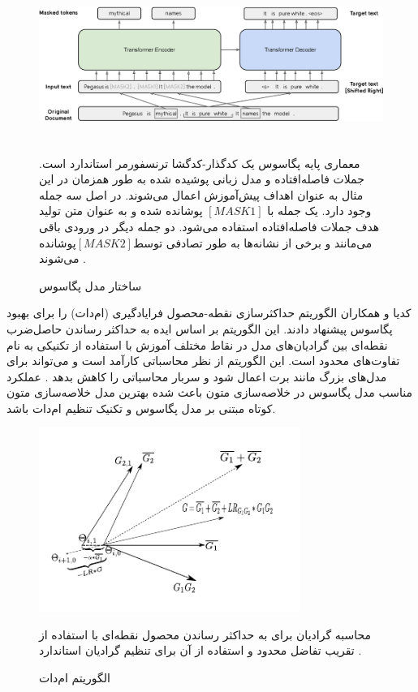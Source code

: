\begin{figure}[!h]
	\begin{center}
		\includegraphics[height=5cm]{pegasus.png}
	\end{center}
	\caption{ ساختار مدل پگاسوس \cite{zhang2020pegasus}}
	\label{fig:pegasus}
	\medskip
	\small{
		معماری پایه پگاسوس یک کدگذار-کدگشا ترنسفورمر استاندارد است. جملات فاصله‌افتاده و مدل زبانی پوشیده شده به طور همزمان در این مثال به عنوان اهداف پيش‌آموزش اعمال می‌شوند. در اصل سه جمله وجود دارد. یک جمله با $ [MASK1] $ پوشانده شده و به عنوان متن تولید هدف جملات فاصله‌افتاده استفاده می‌شود. دو جمله دیگر در ورودی باقی می‌مانند و برخی از نشانه‌ها به طور تصادفی توسط$ [MASK2] $پوشانده می‌شوند
		 \cite{zhang2020pegasus}.}
\end{figure}

کدیا
و همکاران الگوریتم حداکثرسازی نقطه-محصول فرایادگیری (ام‌دات)
را برای بهبود پگاسوس پیشنهاد دادند. این الگوریتم بر اساس ایده به حداکثر رساندن حاصل‌ضرب نقطه‌ای بین گرادیان‌های مدل در نقاط مختلف آموزش با استفاده از تکنیکی به نام تفاوت‌های محدود
است. این الگوریتم از نظر محاسباتی کارآمد است و می‌تواند برای مدل‌های بزرگ مانند برت اعمال شود و سربار محاسباتی را کاهش بدهد \cite{sherborne2023meta}.
عملکرد مناسب مدل پگاسوس در خلاصه‌سازی متون باعث شده بهترین مدل خلاصه‌سازی متون کوتاه مبتنی بر مدل پگاسوس و تکنیک تنظیم
ام‌دات باشد.

\begin{figure}[!h]
	\begin{center}
		\includegraphics[height=6cm]{Mdot.png}
	\end{center}
	\caption{ الگوریتم ام‌دات \cite{sherborne2023meta}}
	\label{fig:Mdot}
	\medskip
	\small{
		محاسبه گرادیان برای به حداکثر رساندن محصول نقطه‌ای با استفاده از تقریب تفاضل محدود و استفاده از آن برای تنظیم گرادیان استاندارد \cite{sherborne2023meta}.
	}
\end{figure}


